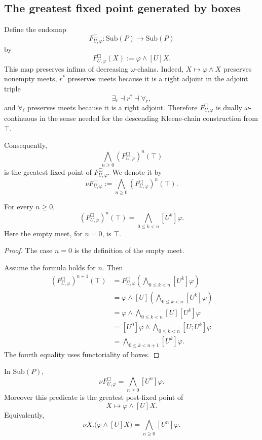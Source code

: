 \subsection{The greatest fixed point generated by boxes}

Define the endomap
\[
F^\Box_{U,\varphi}:\mathrm{Sub}(P)\to\mathrm{Sub}(P)
\]
by
\[
F^\Box_{U,\varphi}(X)
:=
\varphi\wedge[U]X.
\]
This map preserves infima of decreasing \(\omega\)-chains. Indeed, \(X\mapsto\varphi\wedge X\) preserves nonempty meets, \(r^\ast\) preserves meets because it is a right adjoint in the adjoint triple
\[
\exists_r\dashv r^\ast\dashv \forall_r,
\]
and \(\forall_\ell\) preserves meets because it is a right adjoint. Therefore \(F^\Box_{U,\varphi}\) is dually \(\omega\)-continuous in the sense needed for the descending Kleene-chain construction from \(\top\).

Consequently,
\[
\bigwedge_{n\ge0}(F^\Box_{U,\varphi})^n(\top)
\]
is the greatest fixed point of \(F^\Box_{U,\varphi}\). We denote it by
\[
\nu F^\Box_{U,\varphi}
:=
\bigwedge_{n\ge0}(F^\Box_{U,\varphi})^n(\top).
\]

\begin{lemma}
\label{lem:box-approximants}
For every \(n\ge0\),
\[
(F^\Box_{U,\varphi})^n(\top)
=
\bigwedge_{0\le k<n}[U^k]\varphi.
\]
Here the empty meet, for \(n=0\), is \(\top\).
\end{lemma}

\begin{proof}
The case \(n=0\) is the definition of the empty meet.

Assume the formula holds for \(n\). Then
\[
\begin{aligned}
(F^\Box_{U,\varphi})^{n+1}(\top)
&=
F^\Box_{U,\varphi}
\left(
\bigwedge_{0\le k<n}[U^k]\varphi
\right)
\\
&=
\varphi
\wedge
[U]
\left(
\bigwedge_{0\le k<n}[U^k]\varphi
\right)
\\
&=
\varphi
\wedge
\bigwedge_{0\le k<n}
[U][U^k]\varphi
\\
&=
[U^0]\varphi
\wedge
\bigwedge_{0\le k<n}
[U;U^k]\varphi
\\
&=
\bigwedge_{0\le k<n+1}[U^k]\varphi.
\end{aligned}
\]
The fourth equality uses functoriality of boxes.
\end{proof}

\begin{theorem}
\label{thm:box-greatest-fixed-point}
In \(\mathrm{Sub}(P)\),
\[
\nu F^\Box_{U,\varphi}
=
\bigwedge_{n\ge0}[U^n]\varphi.
\]
Moreover this predicate is the greatest post-fixed point of
\[
X\longmapsto \varphi\wedge[U]X.
\]
Equivalently,
\[
\nu X.\bigl(\varphi\wedge[U]X\bigr)
=
\bigwedge_{n\ge0}[U^n]\varphi.
\]
\end{theorem}

